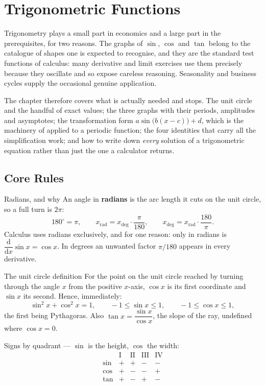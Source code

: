 \chapter{Trigonometric Functions}

Trigonometry plays a small part in economics and a large part in the
prerequisites, for two reasons. The graphs of $\sin$, $\cos$ and $\tan$
belong to the catalogue of shapes one is expected to recognise, and they are
the standard test functions of calculus: many derivative and limit
exercises use them precisely because they oscillate and so expose careless
reasoning. Seasonality and business cycles supply the
occasional genuine application.

The chapter therefore covers what is actually needed and stops. The unit
circle and the handful of exact values; the three graphs with their periods,
amplitudes and asymptotes; the transformation form
$a\sin\bigl(b(x-c)\bigr)+d$, which is the machinery of  applied to a
periodic function; the four identities that carry all the simplification
work; and how to write down \emph{every} solution of a trigonometric
equation rather than just the one a calculator returns.

\section{Core Rules}

\begin{rulebox}{Radians, and why}
An angle in \textbf{radians} is the arc length it cuts on the unit circle,
so a full turn is $2\pi$:
\[
  180^{\circ}=\pi,\qquad
  x_{\text{rad}}=x_{\deg}\cdot\frac{\pi}{180},\qquad
  x_{\deg}=x_{\text{rad}}\cdot\frac{180}{\pi} .
\]
Calculus uses radians exclusively, and for one reason: only in radians is
$\dfrac{\mathrm{d}}{\mathrm{d}x}\sin x=\cos x$. In degrees an unwanted
factor $\pi/180$ appears in every derivative.
\end{rulebox}

\begin{rulebox}{The unit circle definition}
For the point on the unit circle reached by turning through the angle $x$
from the positive $x$-axis, $\cos x$ is its first coordinate and $\sin x$
its second. Hence, immediately:
\[
  \sin^{2}x+\cos^{2}x=1,\qquad
  -1\le\sin x\le1,\qquad -1\le\cos x\le1,
\]
the first being Pythagoras. Also $\tan x=\dfrac{\sin x}{\cos x}$, the slope
of the ray, undefined where $\cos x=0$.

Signs by quadrant --- $\sin$ is the height, $\cos$ the width:
\[
  \begin{array}{c|cccc}
     & \text{I} & \text{II} & \text{III} & \text{IV}\\\hline
    \sin & + & + & - & -\\
    \cos & + & - & - & +\\
    \tan & + & - & + & -
  \end{array}
\]
\end{rulebox}

